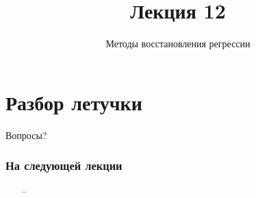 \documentclass[10pt]{beamer}
\title{Лекция 12}
\subtitle{Методы восстановления регрессии}
\begin{document}
\maketitle

\section{Разбор летучки}

\begin{frame}{}
  
\end{frame}

\begin{frame}[standout]
  Вопросы?
\end{frame}

\appendix

\begin{frame}\frametitle{На следующей лекции}
	\begin{itemize}
    	\item[--]  	    	
	\end{itemize}
\end{frame}
\end{document}
